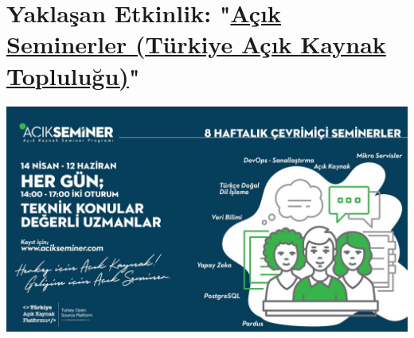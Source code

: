\documentclass[11pt]{article}
\begin{document}
\section{Yaklaşan Etkinlik: "\href{http://www.acikseminer.com/}{Açık Seminerler (Türkiye Açık Kaynak Topluluğu)}"}
\label{sec:org14b5a1e}
\begin{center}
\includegraphics[width=.9\linewidth]{gorseller/acik-seminer.jpeg}
\end{center}
\newpage
\end{document}
